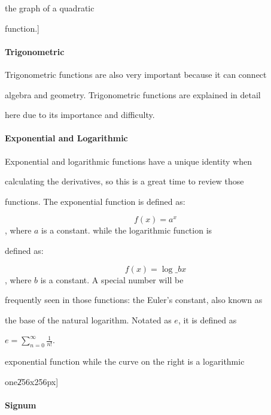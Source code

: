 the graph of a quadratic

function.]



\paragraph{Trigonometric}



Trigonometric functions are also very important because it can connect

algebra and geometry. Trigonometric functions are explained in detail

here due to its importance and difficulty.



\paragraph{Exponential and Logarithmic}



Exponential and logarithmic functions have a unique identity when

calculating the derivatives, so this is a great time to review those

functions. The exponential function is defined as:



$$f(x)=a^x$$, where $a$ is a constant. while the logarithmic function is

defined as:



$$f(x)=\log\_b x$$, where $b$ is a constant. A special number will be

frequently seen in those functions: the Euler's constant, also known as

the base of the natural logarithm. Notated as $e$, it is defined as

$e=\sum_{n=0}^\infty \frac{1}{n!}$.




exponential function while the curve on the right is a logarithmic

one\|256x256px]



\paragraph{Signum}



